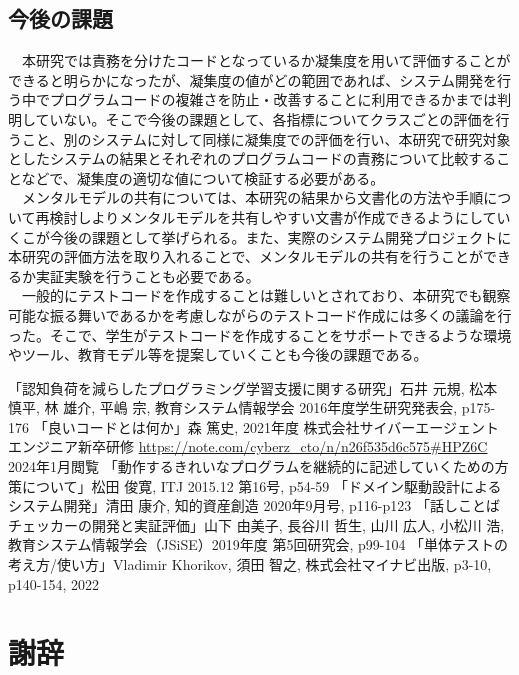 \documentclass[12pt, a4paper]{jreport}
\begin{document}
\section{今後の課題}
　本研究では責務を分けたコードとなっているか凝集度を用いて評価することができると明らかになったが、凝集度の値がどの範囲であれば、システム開発を行う中でプログラムコードの複雑さを防止・改善することに利用できるかまでは判明していない。そこで今後の課題として、各指標についてクラスごとの評価を行うこと、別のシステムに対して同様に凝集度での評価を行い、本研究で研究対象としたシステムの結果とそれぞれのプログラムコードの責務について比較することなどで、凝集度の適切な値について検証する必要がある。
\\　メンタルモデルの共有については、本研究の結果から文書化の方法や手順について再検討しよりメンタルモデルを共有しやすい文書が作成できるようにしていくこが今後の課題として挙げられる。また、実際のシステム開発プロジェクトに本研究の評価方法を取り入れることで、メンタルモデルの共有を行うことができるか実証実験を行うことも必要である。
\\　一般的にテストコードを作成することは難しいとされており、本研究でも観察可能な振る舞いであるかを考慮しながらのテストコード作成には多くの議論を行った。そこで、学生がテストコードを作成することをサポートできるような環境やツール、教育モデル等を提案していくことも今後の課題である。
\renewcommand{\bibname}{参考文献}
\begin{thebibliography}{20}
「認知負荷を減らしたプログラミング学習支援に関する研究」石井 元規, 松本 慎平, 林 雄介, 平嶋 宗, 教育システム情報学会 2016年度学生研究発表会, p175-176
「良いコードとは何か」森 篤史, 2021年度 株式会社サイバーエージェント エンジニア新卒研修
\url{https://note.com/cyberz_cto/n/n26f535d6c575#HPZ6C} 2024年1月閲覧
「動作するきれいなプログラムを継続的に記述していくための方策について」松田 俊寛, ITJ 2015.12 第16号, p54-59
「ドメイン駆動設計によるシステム開発」清田 康介, 知的資産創造 2020年9月号, p116-p123
「話しことばチェッカーの開発と実証評価」山下 由美子, 長谷川 哲生, 山川 広人, 小松川 浩, 教育システム情報学会（JSiSE）2019年度 第5回研究会, p99-104
「単体テストの考え方/使い方」Vladimir Khorikov, 須田 智之, 株式会社マイナビ出版, p3-10, p140-154, 2022
\end{thebibliography}

\chapter*{謝辞}
\end{document}
